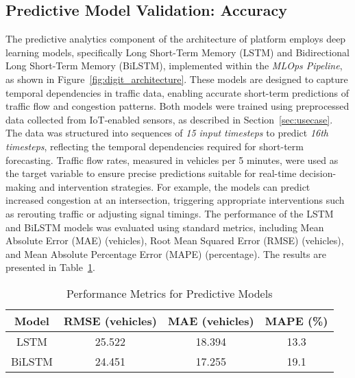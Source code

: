 \subsection{Predictive Model Validation: Accuracy}  

The predictive analytics component of the architecture of \digit platform employs deep learning models, specifically Long Short-Term Memory (LSTM) and Bidirectional Long Short-Term Memory (BiLSTM), implemented within the \textit{MLOps Pipeline}, as shown in Figure~\ref{fig:digit_architecture}. These models are designed to capture temporal dependencies in traffic data, enabling accurate short-term predictions of traffic flow and congestion patterns. Both models were trained using preprocessed data collected from IoT-enabled sensors, as described in Section~\ref{sec:usecase}. The data was structured into sequences of \textit{15 input timesteps} to predict \textit{16th timesteps}, reflecting the temporal dependencies required for short-term forecasting. Traffic flow rates, measured in vehicles per 5 minutes, were used as the target variable to ensure precise predictions suitable for real-time decision-making and intervention strategies. For example, the models can predict increased congestion at an intersection, triggering appropriate interventions such as rerouting traffic or adjusting signal timings. The performance of the LSTM and BiLSTM models was evaluated using standard metrics, including Mean Absolute Error (MAE) (vehicles), Root Mean Squared Error (RMSE) (vehicles), and Mean Absolute Percentage Error (MAPE) (percentage). The results are presented in Table~\ref{tab:model_metrics}.  

\begin{table}[h!]
\centering
\caption{Performance Metrics for Predictive Models}
\label{tab:model_metrics}
\begin{tabular}{|c|c|c|c|}
\hline
\textbf{Model} & \textbf{RMSE (vehicles)} & \textbf{MAE (vehicles)} & \textbf{MAPE (\%)} \\ \hline
LSTM           & 25.522                   & 18.394                  & 13.3               \\ \hline
BiLSTM         & 24.451                   & 17.255                  & 19.1               \\ \hline
\end{tabular}
\end{table}

